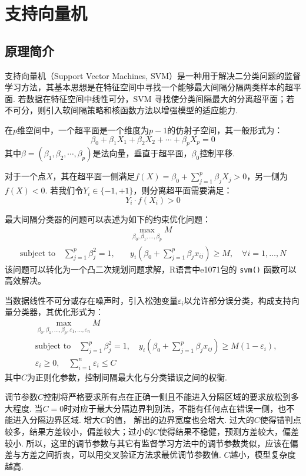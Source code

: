 \documentclass[12pt, a4paper, oneside]{ctexart}
\begin{document}
	\section{支持向量机}
	\subsection{原理简介}
	
	支持向量机（Support Vector Machines, SVM）是一种用于解决二分类问题的监督学习方法，其基本思想是在特征空间中寻找一个能够最大间隔分隔两类样本的超平面. 若数据在特征空间中线性可分，SVM 寻找使分类间隔最大的分离超平面；若不可分，则引入软间隔策略和核函数方法以增强模型的适应能力.
	
	在$p$维空间中，一个超平面是一个维度为$p-1$的仿射子空间，其一般形式为：
	\[
	\beta_0 + \beta_1X_1 + \beta_2X_2 + \cdots + \beta_pX_p = 0
	\]
	其中$\beta=(\beta_1,\beta_2,\cdots,\beta_p)$是法向量，垂直于超平面，$\beta_0$控制平移.
	
	 对于一个点$X$，其在超平面一侧满足$f(X) = \beta_0 + \sum_{j=1}^p \beta_jX_j > 0$，另一侧为$f(X) < 0$. 若我们令$Y_i \in \{-1, +1\}$，则分离超平面需要满足：
	\[
	Y_i \cdot f(X_i) > 0
	\]
	
	最大间隔分类器的问题可以表述为如下的约束优化问题：
	\[
	\begin{aligned}
		& \max_{\beta_0, \beta_1, \ldots, \beta_p} M \\
		 \text{subject to} \quad \sum_{j=1}^{p} \beta_j^2 = 1, \quad &y_i(\beta_0 + \sum_{j=1}^{p} \beta_j x_{ij}) \geq M, \quad \forall i = 1,\ldots,N
	\end{aligned}
	\]
	该问题可以转化为一个凸二次规划问题求解，R语言中e1071包的 \texttt{svm()} 函数可以高效解决。
	
	当数据线性不可分或存在噪声时，引入松弛变量$\varepsilon_i$以允许部分误分类，构成支持向量分类器，其优化形式为：
	\[
	\begin{aligned}
		& \max_{\beta_0, \beta_1, \ldots, \beta_p, \varepsilon_1, \ldots, \varepsilon_n} M \\
		& \text{subject to} \quad \sum_{j=1}^{p} \beta_j^2 = 1, \quad y_i(\beta_0 + \sum_{j=1}^{p} \beta_j x_{ij}) \geq M(1 - \varepsilon_i), \\
		& \varepsilon_i \geq 0, \quad \sum_{i=1}^{n} \varepsilon_i \leq C
	\end{aligned}
	\]
	其中$C$为正则化参数，控制间隔最大化与分类错误之间的权衡. 
	
	调节参数$C$控制将严格要求所有点在正确一侧且不能进入分隔区域的要求放松到多大程度. 当$C = 0$时对应于最大分隔边界判别法，不能有任何点在错误一侧，也不能进入分隔边界区域. 增大$C$的值， 解出的边界宽度也会增大. 过大的$C$使得错判点较多，结果方差较小，偏差较大；过小的$C$使得结果不稳健，预测方差较大，偏差较小. 所以，这里的调节参数与其它有监督学习方法中的调节参数类似，应该在偏差与方差之间折衷，可以用交叉验证方法求最优调节参数值. $C$越小，模型复杂度越高.
	
\end{document}
